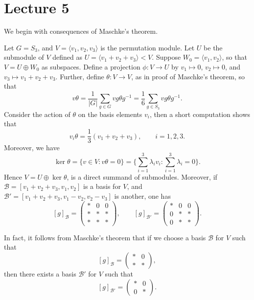 \documentclass[11pt, notitlepage]{article}
\numberwithin{equation}{section}
\theoremstyle{plain}
\theoremstyle{definition}
\newenvironment{example}
	{\pushQED{\qed}\renewcommand{\qedsymbol}{$\blacktriangleleft$}\examplex}
	{\popQED\endexamplex}
\begin{document}



\section{Lecture 5}



We begin with consequences of Maschke's theorem.

\begin{example}
Let $G = S_3$, and $V = \langle v_1,v_2,v_3 \rangle$ is the permutation module. Let $U$ be the submodule of $V$ defined as $U = \langle v_1 + v_2 + v_3 \rangle < V$. Suppose $W_0 = \langle v_1, v_2 \rangle$, so that $V = U \oplus W_0$ as subspaces. Define a projection $\phi : V \to U$ by $v_1 \mapsto 0$, $v_2 \mapsto 0$, and $v_3 \mapsto v_1 + v_2 + v_3$. Further, define $\theta : V \to V$, as in proof of Maschke's theorem, so that
\[
    v\theta = \frac{1}{|G|}\sum_{g \in G}vg\theta g^{-1} = \frac{1}{6}\sum_{g \in S_3}vg\theta g^{-1}.
\]
Consider the action of $\theta$ on the basis elements $v_i$, then a short computation shows that
\[
    v_i\theta = \frac{1}{3}(v_1 + v_2 + v_3), \qquad i=1,2,3.
\]
Moreover, we have
\[
    \ker \theta = \{v \in V : v\theta = 0\} = \bigg\{\sum_{i=1}^3 \lambda_iv_i : \sum_{i=1}^3 \lambda_i = 0\bigg\}.
\]
Hence $V = U \oplus \ker \theta$, is a direct summand of submodules. Moreover, if $\mathcal B = [v_1+v_2+v_3,v_1,v_2]$ is a basis for $V$, and $\mathcal B' = [v_1 + v_2 + v_3, v_1 - v_2, v_2 - v_3]$ is another, one has
\[
    [g]_{\mathcal B} = \begin{pmatrix*}
        * & 0 & 0\\
        * & * & *\\
        * & * & *
    \end{pmatrix*}, \qquad [g]_{\mathcal B'} = \begin{pmatrix*}
        * & 0 & 0\\
        0 & * & *\\
        0 & * & *
    \end{pmatrix*}.
\]
\end{example}

In fact, it follows from Maschke's theorem that if we choose a basis $\mathcal B$ for $V$ such that
\[
    [g]_{\mathcal B} = \begin{pmatrix*}
        * & 0\\ * & *
    \end{pmatrix*},
\]
then there exists a basis $\mathcal B'$ for $V$ such that
\[
    [g]_{\mathcal B'} = \begin{pmatrix*}
        * & 0\\0 & *
    \end{pmatrix*}.
\]
\end{document}
